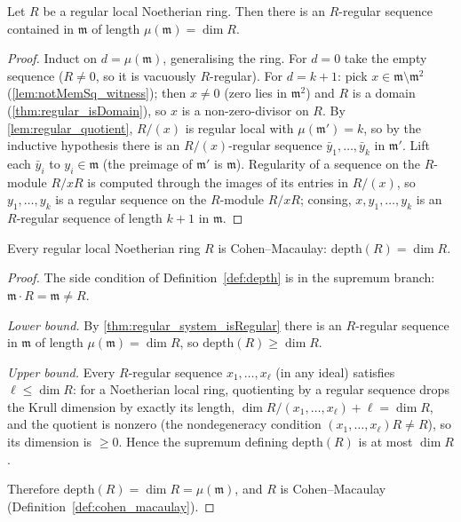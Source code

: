 \begin{theorem}
  \label{thm:regular_system_isRegular}
  \leanok
  Let \(R\) be a regular local Noetherian ring. Then there is an \(R\)-regular sequence
  contained in \(\mathfrak m\) of length \(\mu(\mathfrak m) = \dim R\).
\end{theorem}
\begin{proof}
  \leanok
  Induct on \(d = \mu(\mathfrak m)\), generalising the ring. For \(d = 0\) take the
  empty sequence (\(R \neq 0\), so it is vacuously \(R\)-regular). For \(d = k + 1\):
  pick \(x \in \mathfrak m \setminus \mathfrak m^2\) (\ref{lem:notMemSq_witness}); then
  \(x \neq 0\) (zero lies in \(\mathfrak m^2\)) and \(R\) is a domain
  (\ref{thm:regular_isDomain}), so \(x\) is a non-zero-divisor on \(R\). By
  \ref{lem:regular_quotient}, \(R/(x)\) is regular local with
  \(\mu(\mathfrak m') = k\), so by the inductive hypothesis there is an
  \(R/(x)\)-regular sequence \(\bar y_1, \dots, \bar y_k\) in \(\mathfrak m'\). Lift
  each \(\bar y_i\) to \(y_i \in \mathfrak m\) (the preimage of \(\mathfrak m'\) is
  \(\mathfrak m\)). Regularity of a sequence on the \(R\)-module \(R/xR\) is computed
  through the images of its entries in \(R/(x)\), so \(y_1, \dots, y_k\) is a regular
  sequence on the \(R\)-module \(R/xR\); consing, \(x, y_1, \dots, y_k\) is an
  \(R\)-regular sequence of length \(k + 1\) in \(\mathfrak m\).
\end{proof}

\begin{theorem}
  \label{thm:regular_is_CM}
  \leanok
  Every regular local Noetherian ring \(R\) is Cohen--Macaulay:
  \(\mathrm{depth}(R) = \dim R\).
\end{theorem}
\begin{proof}
  \leanok
  The side condition of Definition~\ref{def:depth} is in the supremum branch:
  \(\mathfrak m \cdot R = \mathfrak m \neq R\).

  \emph{Lower bound.} By \ref{thm:regular_system_isRegular} there is an \(R\)-regular
  sequence in \(\mathfrak m\) of length \(\mu(\mathfrak m) = \dim R\), so
  \(\mathrm{depth}(R) \geq \dim R\).

  \emph{Upper bound.} Every \(R\)-regular sequence \(x_1, \dots, x_\ell\) (in any
  ideal) satisfies \(\ell \leq \dim R\): for a Noetherian local ring, quotienting by a
  regular sequence drops the Krull dimension by exactly its length,
  \(\dim R/(x_1, \dots, x_\ell) + \ell = \dim R\), and the quotient is nonzero (the
  nondegeneracy condition \((x_1, \dots, x_\ell)R \neq R\)), so its dimension is
  \(\geq 0\). Hence the supremum defining \(\mathrm{depth}(R)\) is at most
  \(\dim R\).

  Therefore \(\mathrm{depth}(R) = \dim R = \mu(\mathfrak m)\), and \(R\) is
  Cohen--Macaulay (Definition~\ref{def:cohen_macaulay}).
\end{proof}
